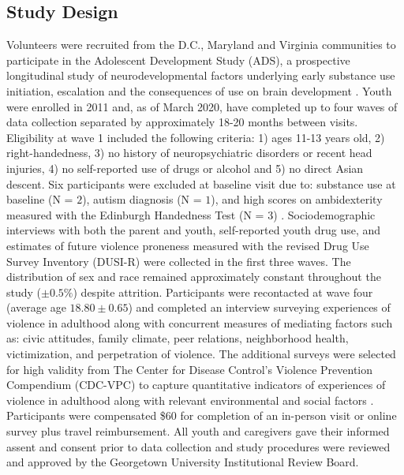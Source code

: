 \documentclass[utf8]{frontiersSCNS} %
\begin{document}
\subsection{Study Design} 
Volunteers were recruited from the D.C., Maryland and Virginia communities to participate in the Adolescent Development Study (ADS), a prospective longitudinal study of neurodevelopmental factors underlying early substance use initiation, escalation and the consequences of use on brain development \citep{Fishbein2016}. Youth were enrolled in 2011 and, as of March 2020, have completed up to four waves of data collection separated by approximately 18-20 months between visits. Eligibility at wave 1 included the following criteria: 1) ages 11-13 years old, 2) right-handedness, 3) no history of neuropsychiatric disorders or recent head injuries, 4) no self-reported use of drugs or alcohol and 5) no direct Asian descent. Six participants were excluded at baseline visit due to: substance use at baseline (N = $2$), autism diagnosis (N = $1$), and high scores on ambidexterity measured with the Edinburgh Handedness Test (N = $3$) \citep{veale2014edinburgh}. Sociodemographic interviews with both the parent and youth, self-reported youth drug use, and estimates of future violence proneness measured with the revised Drug Use Survey Inventory (DUSI-R) \citep{tarter1994reliability} were collected in the first three waves. The distribution of sex and race remained approximately constant throughout the study ($\pm0.5\%$) despite attrition. Participants were recontacted at wave four (average age $18.80\pm0.65$) and completed an interview surveying experiences of violence in adulthood along with concurrent measures of mediating factors such as: civic attitudes, family climate, peer relations, neighborhood health, victimization, and perpetration of violence. The additional surveys were selected for high validity from The Center for Disease Control’s Violence Prevention Compendium (CDC-VPC) to capture quantitative indicators of experiences of violence in adulthood along with relevant environmental and social factors \citep{dahlberg2005measuring}. Participants were compensated \$$60$ for completion of an in-person visit or online survey plus travel reimbursement. All youth and caregivers gave their informed assent and consent prior to data collection and study procedures were reviewed and approved by the Georgetown University Institutional Review Board.
\end{document}
